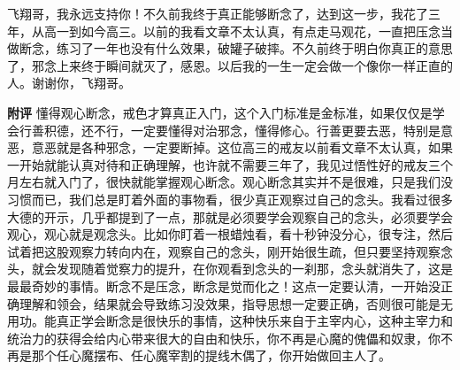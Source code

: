\begin{case}
    飞翔哥，我永远支持你！不久前我终于真正能够断念了，达到这一步，我花了三年，从高一到如今高三。以前的我看文章不太认真，有点走马观花，一直把压念当做断念，练习了一年也没有什么效果，破罐子破摔。不久前终于明白你真正的意思了，邪念上来终于瞬间就灭了，感恩。以后我的一生一定会做一个像你一样正直的人。谢谢你，飞翔哥。

    \textbf{附评} 懂得观心断念，戒色才算真正入门，这个入门标准是金标准，如果仅仅是学会行善积德，还不行，一定要懂得对治邪念，懂得修心。行善更要去恶，特别是意恶，意恶就是各种邪念，一定要断掉。这位高三的戒友以前看文章不太认真，如果一开始就能认真对待和正确理解，也许就不需要三年了，我见过悟性好的戒友三个月左右就入门了，很快就能掌握观心断念。观心断念其实并不是很难，只是我们没习惯而已，我们总是盯着外面的事物看，很少真正观察过自己的念头。我看过很多大德的开示，几乎都提到了一点，那就是必须要学会观察自己的念头，必须要学会观心，观心就是观念头。比如你盯着一根蜡烛看，看十秒钟没分心，很专注，然后试着把这股观察力转向内在，观察自己的念头，刚开始很生疏，但只要坚持观察念头，就会发现随着觉察力的提升，在你观看到念头的一刹那，念头就消失了，这是最最奇妙的事情。断念不是压念，断念是觉而化之！这点一定要认清，一开始没正确理解和领会，结果就会导致练习没效果，指导思想一定要正确，否则很可能是无用功。能真正学会断念是很快乐的事情，这种快乐来自于主宰内心，这种主宰力和统治力的获得会给内心带来很大的自由和快乐，你不再是心魔的傀儡和奴隶，你不再是那个任心魔摆布、任心魔宰割的提线木偶了，你开始做回主人了。
\end{case}

